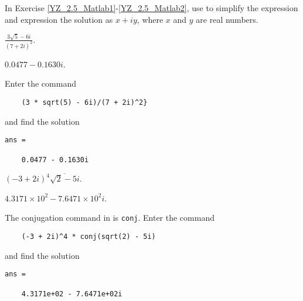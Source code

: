 \documentclass{ximera}
\begin{document}
In Exercise \ref{YZ_2.5_Matlab1}-\ref{YZ_2.5_Matlab2}, use \Matlab to simplify the expression and expression the solution as $x+iy$, where $x$ and $y$ are real numbers.
\begin{computerExercise}\label{YZ_2.5_Matlab1}
$\frac{3\sqrt{5}-6i}{(7+2i)^2}$.

\begin{solution}
\ans $0.0477 - 0.1630i$.

\soln 
Enter the command 

\begin{verbatim}
    (3 * sqrt(5) - 6i)/(7 + 2i)^2}
\end{verbatim}

 and find the solution 
\begin{verbatim}
ans =

    0.0477 - 0.1630i
\end{verbatim}
\end{solution}
\end{computerExercise}

\begin{computerExercise}\label{YZ_2.5_Matlab2}
$(-3 + 2i)^4\overline{\sqrt{2} - 5i}$.

\begin{solution}
\ans $4.3171\times 10^2 - 7.6471\times 10^2i$.

\soln  The conjugation command in \Matlab is {\tt conj}. Enter the command 

\begin{verbatim}
    (-3 + 2i)^4 * conj(sqrt(2) - 5i)
\end{verbatim}

 and find the solution 
\begin{verbatim}
ans =

    4.3171e+02 - 7.6471e+02i
\end{verbatim}

\end{solution}
\end{computerExercise}
\end{document}
